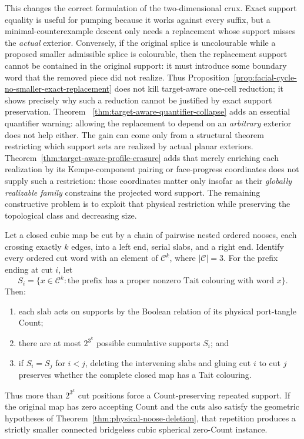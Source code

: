 This changes the correct formulation of the two-dimensional crux.  Exact
support equality is useful for pumping because it works against every suffix,
but a minimal-counterexample descent only needs a replacement whose support
misses the \emph{actual} exterior.  Conversely, if the original splice is
uncolourable while a proposed smaller admissible splice is colourable, then
the replacement support cannot be contained in the original support:
it must introduce some boundary word that the removed piece did not realize.
Thus Proposition~\ref{prop:facial-cycle-no-smaller-exact-replacement} does not
kill target-aware one-cell reduction; it shows precisely why such a reduction
cannot be justified by exact support preservation.  Theorem~
\ref{thm:target-aware-quantifier-collapse} adds an essential quantifier
warning: allowing the replacement to depend on an \emph{arbitrary} exterior
does not help either.  The gain can come only from a structural theorem
restricting which support sets are realized by actual planar exteriors.
Theorem~\ref{thm:target-aware-profile-erasure} adds that merely enriching each
realization by its Kempe-component pairing or face-progress coordinates does
not supply such a restriction: those coordinates matter only insofar as their
\emph{globally realizable family} constrains the projected word support.
The remaining constructive problem is to exploit that physical restriction
while preserving the topological class and decreasing size.

\begin{theorem}
\label{thm:raw-noose-count-pumping}
\Sprose
Let a closed cubic map be cut by a chain of pairwise nested ordered nooses,
each crossing exactly \(k\) edges, into a left end, serial slabs, and a right
end.  Identify every ordered cut word with an element of
\(\mathcal C^k\), where \(|\mathcal C|=3\).  For the prefix ending at cut
\(i\), let
\[
 S_i=\{x\in\mathcal C^k:
       \text{the prefix has a proper nonzero Tait colouring with word }x\}.
\]
Then:
\begin{enumerate}
\item each slab acts on supports by the Boolean relation of its physical
port-tangle Count;
\item there are at most \(2^{3^k}\) possible cumulative supports \(S_i\);
and
\item if \(S_i=S_j\) for \(i<j\), deleting the intervening slabs and gluing
cut \(i\) to cut \(j\) preserves whether the complete closed map has a Tait
colouring.
\end{enumerate}
Thus more than \(2^{3^k}\) cut positions force a Count-preserving repeated
support.  If the original map has zero accepting Count and the cuts also
satisfy the geometric hypotheses of
Theorem~\ref{thm:physical-noose-deletion}, that repetition produces a
strictly smaller connected bridgeless cubic spherical zero-Count instance.
\end{theorem}

